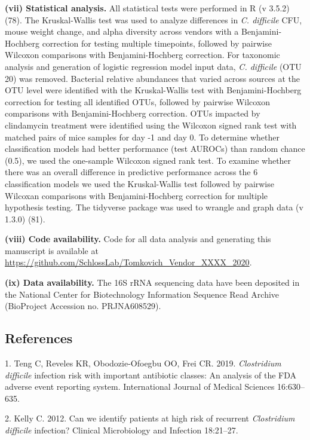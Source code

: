 \documentclass[11pt,]{article}
\begin{document}
\textbf{(vii) Statistical analysis.} All statistical tests were
performed in R (v 3.5.2) (78). The Kruskal-Wallis test was used to
analyze differences in \emph{C. difficile} CFU, mouse weight change, and
alpha diversity across vendors with a Benjamini-Hochberg correction for
testing multiple timepoints, followed by pairwise Wilcoxon comparisons
with Benjamini-Hochberg correction. For taxonomic analysis and
generation of logistic regression model input data, \emph{C. difficile}
(OTU 20) was removed. Bacterial relative abundances that varied across
sources at the OTU level were identified with the Kruskal-Wallis test
with Benjamini-Hochberg correction for testing all identified OTUs,
followed by pairwise Wilcoxon comparisons with Benjamini-Hochberg
correction. OTUs impacted by clindamycin treatment were identified using
the Wilcoxon signed rank test with matched pairs of mice samples for day
-1 and day 0. To determine whether classification models had better
performance (test AUROCs) than random chance (0.5), we used the
one-sample Wilcoxon signed rank test. To examine whether there was an
overall difference in predictive performance across the 6 classification
models we used the Kruskal-Wallis test followed by pairwise Wilcoxan
comparisons with Benjamini-Hochberg correction for multiple hypothesis
testing. The tidyverse package was used to wrangle and graph data (v
1.3.0) (81).

\textbf{(viii) Code availability.} Code for all data analysis and
generating this manuscript is available at
\url{https://github.com/SchlossLab/Tomkovich_Vendor_XXXX_2020}.

\textbf{(ix) Data availability.} The 16S rRNA sequencing data have been
deposited in the National Center for Biotechnology Information Sequence
Read Archive (BioProject Accession no. PRJNA608529).

\newpage

\subsection{References}\label{references}

\hypertarget{refs}{}
\hypertarget{ref-Teng2019}{}
1. Teng C, Reveles KR, Obodozie-Ofoegbu OO, Frei CR. 2019.
\emph{Clostridium difficile} infection risk with important antibiotic
classes: An analysis of the FDA adverse event reporting system.
International Journal of Medical Sciences 16:630--635.

\hypertarget{ref-Kelly2012}{}
2. Kelly C. 2012. Can we identify patients at high risk of recurrent
\emph{Clostridium difficile} infection? Clinical Microbiology and
Infection 18:21--27.
\end{document}
